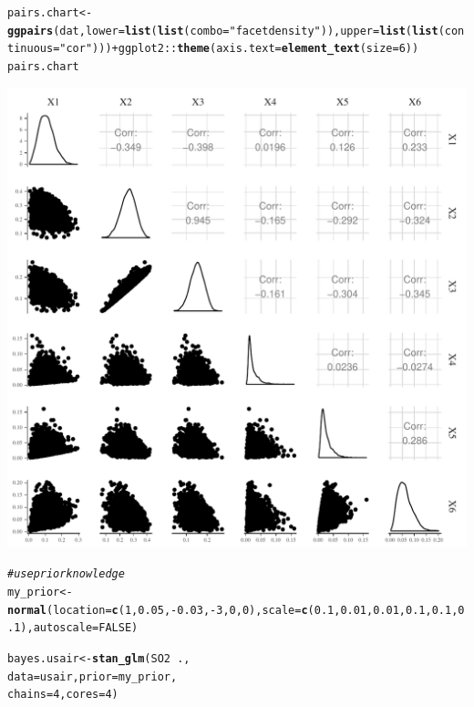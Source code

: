 \documentclass[11pt,a4paper,twoside]{book}\usepackage[]{graphicx}\usepackage[]{color}
\makeatletter
\def\maxwidth{ %
  \ifdim\Gin@nat@width>\linewidth
    \linewidth
  \else
    \Gin@nat@width
  \fi
}
\newcommand{\hlnum}[1]{\textcolor[rgb]{0.686,0.059,0.569}{#1}}%
\newcommand{\hlstr}[1]{\textcolor[rgb]{0.192,0.494,0.8}{#1}}%
\newcommand{\hlcom}[1]{\textcolor[rgb]{0.678,0.584,0.686}{\textit{#1}}}%
\newcommand{\hlopt}[1]{\textcolor[rgb]{0,0,0}{#1}}%
\newcommand{\hlstd}[1]{\textcolor[rgb]{0.345,0.345,0.345}{#1}}%
\newcommand{\hlkwb}[1]{\textcolor[rgb]{0.69,0.353,0.396}{#1}}%
\newcommand{\hlkwc}[1]{\textcolor[rgb]{0.333,0.667,0.333}{#1}}%
\newcommand{\hlkwd}[1]{\textcolor[rgb]{0.737,0.353,0.396}{\textbf{#1}}}%
\newenvironment{kframe}{%
 \def\at@end@of@kframe{}%
 \ifinner\ifhmode%
  \def\at@end@of@kframe{\end{minipage}}%
  \begin{minipage}{\columnwidth}%
 \fi\fi%
 \def\FrameCommand##1{\hskip\@totalleftmargin \hskip-\fboxsep
 \colorbox{shadecolor}{##1}\hskip-\fboxsep
     \hskip-\linewidth \hskip-\@totalleftmargin \hskip\columnwidth}%
 \MakeFramed {\advance\hsize-\width
   \@totalleftmargin\z@ \linewidth\hsize
   \@setminipage}}%
 {\par\unskip\endMakeFramed%
 \at@end@of@kframe}
\newenvironment{knitrout}{}{} %
\makeatother
\begin{document}
\begin{knitrout}
\begin{kframe}
\begin{alltt}
\hlstd{pairs.chart} \hlkwb{<-} \hlkwd{ggpairs}\hlstd{(dat,} \hlkwc{lower} \hlstd{=} \hlkwd{list}\hlstd{(}\hlkwd{list}\hlstd{(}\hlkwc{combo} \hlstd{=} \hlstr{"facetdensity"}\hlstd{)),} \hlkwc{upper} \hlstd{=} \hlkwd{list}\hlstd{(}\hlkwd{list}\hlstd{(}\hlkwc{continuous} \hlstd{=} \hlstr{"cor"}\hlstd{)))} \hlopt{+} \hlstd{ggplot2}\hlopt{::}\hlkwd{theme}\hlstd{(}\hlkwc{axis.text} \hlstd{=} \hlkwd{element_text}\hlstd{(}\hlkwc{size} \hlstd{=} \hlnum{6}\hlstd{))}
\hlstd{pairs.chart}
\end{alltt}
\end{kframe}
\includegraphics[width=\maxwidth]{figure/ch03_figreal_data_LMG-1} 
\begin{kframe}\begin{alltt}
\hlcom{#use prior knowledge}
\hlstd{my_prior} \hlkwb{<-} \hlkwd{normal}\hlstd{(}\hlkwc{location} \hlstd{=} \hlkwd{c}\hlstd{(}\hlnum{1}\hlstd{,} \hlnum{0.05}\hlstd{,}\hlopt{-}\hlnum{0.03}\hlstd{,}\hlopt{-}\hlnum{3}\hlstd{,} \hlnum{0}\hlstd{,} \hlnum{0}\hlstd{),} \hlkwc{scale} \hlstd{=} \hlkwd{c}\hlstd{(}\hlnum{0.1}\hlstd{,} \hlnum{0.01}\hlstd{,}\hlnum{0.01}\hlstd{,}\hlnum{0.1}\hlstd{,} \hlnum{0.1}\hlstd{,} \hlnum{0.1}\hlstd{),} \hlkwc{autoscale} \hlstd{=} \hlnum{FALSE}\hlstd{)}


\hlstd{bayes.usair} \hlkwb{<-} \hlkwd{stan_glm}\hlstd{(SO2} \hlopt{~} \hlstd{. ,}
                  \hlkwc{data} \hlstd{= usair,} \hlkwc{prior} \hlstd{= my_prior,}
                  \hlkwc{chains} \hlstd{=} \hlnum{4}\hlstd{,} \hlkwc{cores} \hlstd{=} \hlnum{4}\hlstd{)}


\end{alltt}
\end{kframe}
\end{knitrout}
\end{document}
